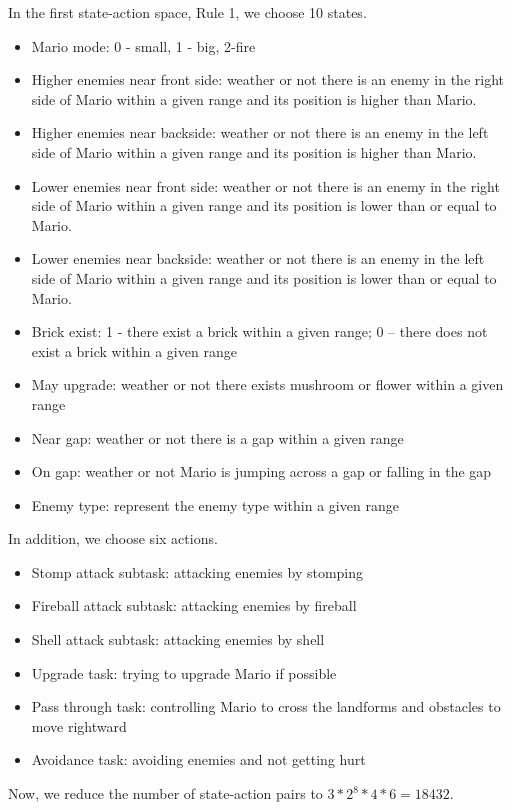 In the first state-action space, Rule 1, we choose 10 states.
\begin{itemize}
\item Mario mode: 0 - small, 1 - big, 2-fire
\item Higher enemies near front side: weather or not there is an enemy in the right side of Mario within a given range and its position is higher than Mario.
\item Higher enemies near backside: weather or not there is an enemy in the left side of Mario within a given range and its position is higher than Mario.
\item Lower enemies near front side: weather or not there is an enemy in the right side of Mario within a given range and its position is lower than or equal to Mario.
\item Lower enemies near backside: weather or not there is an enemy in the left side of Mario within a given range and its position is lower than or equal to Mario.
\item Brick exist: 1 - there exist a brick within a given range; 0 -- there does not exist a brick within a given range
\item May upgrade: weather or not there exists mushroom or flower within a given range
\item Near gap: weather or not there is a gap within a given range
\item On gap: weather or not Mario is jumping across a gap or falling in the gap
\item Enemy type: represent the enemy type within a given range
\end{itemize}

In addition, we choose six actions.
\begin{itemize}
\item Stomp attack subtask: attacking enemies by stomping
\item Fireball attack subtask: attacking enemies by fireball
\item Shell attack subtask: attacking enemies by shell
\item Upgrade task: trying to upgrade Mario if possible
\item Pass through task: controlling Mario to cross the landforms and obstacles to move rightward
\item Avoidance task: avoiding enemies and not getting hurt
\end{itemize}

Now, we reduce the number of state-action pairs to $3*2^8*4*6 = 18432$.

